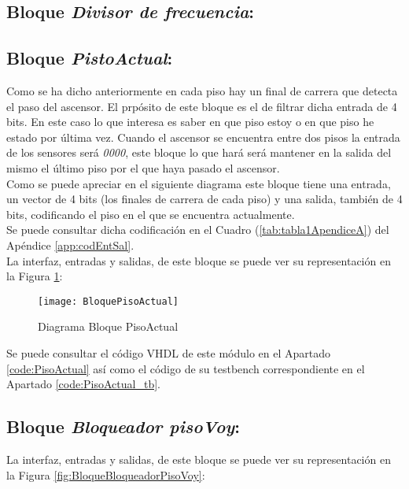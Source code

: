 \subsection{Bloque \textit{Divisor de frecuencia}:}

\subsection{Bloque \textit{PistoActual}:}
    Como se ha dicho anteriormente en cada piso hay un final de carrera que detecta el paso del ascensor. El prpósito de este bloque es el de filtrar dicha entrada de 4 bits. En este caso lo que interesa es saber en que piso estoy o en que piso he estado por última vez. Cuando el ascensor se encuentra entre dos pisos la entrada de los sensores será \textit{0000}, este bloque lo que hará será mantener en la salida del mismo el último piso por el que haya pasado el ascensor. \\ 
    
    Como se puede apreciar en el siguiente diagrama este bloque tiene una entrada, un vector de 4 bits (los finales de carrera de cada piso) y una salida, también de 4 bits, codificando el piso en el que se encuentra actualmente. \\ 
    
    Se puede consultar dicha codificación en el Cuadro (\ref{tab:tabla1ApendiceA}) del Apéndice \ref{app:codEntSal}. \\ 
    
    La interfaz, entradas y salidas, de este bloque se puede ver su representación en la Figura \ref{fig:BloquePisoActual}:
    
    \begin{figure}[H]
		    \centering
		    \hspace*{-1.8cm}
		    \texttt{[image: BloquePisoActual]}
		    \caption{Diagrama Bloque PisoActual}
		    \label{fig:BloquePisoActual}
	\end{figure}
	
	Se puede consultar el código VHDL de este módulo en el Apartado \ref{code:PisoActual} así como el código de su testbench correspondiente en el Apartado \ref{code:PisoActual_tb}.

\subsection{Bloque \textit{Bloqueador pisoVoy}:}
    
    La interfaz, entradas y salidas, de este bloque se puede ver su representación en la Figura \ref{fig:BloqueBloqueadorPisoVoy}:
    
